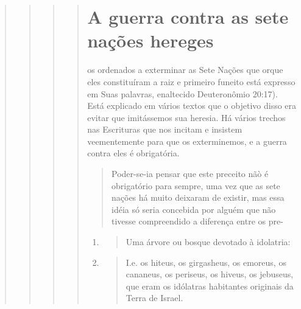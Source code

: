 \begin{quote}
\begin{quote}
\begin{quote}
\begin{quote}
\section{A guerra contra as sete nações hereges}

os ordenados a exterminar as Sete Nações que orque eles constituíram a
raiz e primeiro fun­eito está expresso em Suas palavras, enaltecido
Deuteronômio 20:17). Está explicado em vários textos que o objetivo
disso era evitar que imitássemos sua heresia. Há vários trechos nas
Escrituras que nos incitam e insistem veementemente para que os
exterminemos, e a guerra contra eles é obrigatória.

\begin{quote}
Poder-se-ia pensar que este preceito nãò é obrigatório para sempre, uma
vez que as sete nações há muito deixaram de existir, mas essa idéia só
seria concebida por alguém que não tivesse compreendido a diferença
entre os pre-
\end{quote}

\begin{enumerate}
\def\labelenumi{\arabic{enumi}.}
\setcounter{enumi}{191}
\item
 \begin{quote}
 Uma árvore ou bosque devotado à idolatria:
 \end{quote}
\item
 \begin{quote}
 I.e. os hiteus, os girgasheus, os emoreus, os cananeus, os periseus,
 os hiveus, os jebuseus, que eram os idólatras habitantes originais da
 Terra de Israel.
 \end{quote}
\end{enumerate}


\end{quote}
\end{quote}
\end{quote}
\end{quote}
